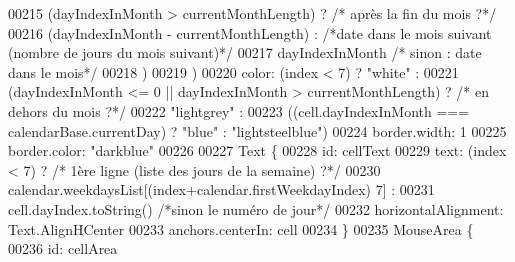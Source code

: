 \begin{DoxyCode}
{{{00215                                                                                                            
                                  (dayIndexInMonth > currentMonthLength) ? \textcolor{comment}{/* après la fin du mois ?*/}
00216                                                                                                            
                                                                           (dayIndexInMonth - currentMonthLength) 
      : \textcolor{comment}{/*date dans le mois suivant (nombre de jours du mois suivant)*/}
00217                                                                                                            
                                                                           dayIndexInMonth \textcolor{comment}{/* sinon : date dans le
       mois*/}
00218                                                                                                            
                                  )
00219                                                                   )
00220                         color: (index < 7) ? \textcolor{stringliteral}{"white"} :
00221                                              (dayIndexInMonth <= 0 || dayIndexInMonth > currentMonthLength)
       ? \textcolor{comment}{/* en dehors du mois ?*/}
00222                                                                                                            
         \textcolor{stringliteral}{"lightgrey"} :
00223                                                                                                            
         ((cell.dayIndexInMonth === calendarBase.currentDay) ? \textcolor{stringliteral}{"blue"} : \textcolor{stringliteral}{"lightsteelblue"})
00224                         border.width: 1
00225                         border.color: \textcolor{stringliteral}{"darkblue"}
00226 
00227                         Text \{
00228                             \textcolor{keywordtype}{id}: cellText
00229                             text: (index < 7) ? \textcolor{comment}{/* 1ère ligne (liste des jours de la semaine) ?*/}
00230                                                 calendar.weekdaysList[(index+calendar.firstWeekdayIndex) %
      7] :
00231                                                 cell.dayIndex.toString() \textcolor{comment}{/*sinon le numéro de jour*/}
00232                             horizontalAlignment: Text.AlignHCenter
00233                             anchors.centerIn: cell
00234                         \}
00235                         MouseArea \{
00236                             \textcolor{keywordtype}{id}: cellArea
}}}
\end{DoxyCode}
